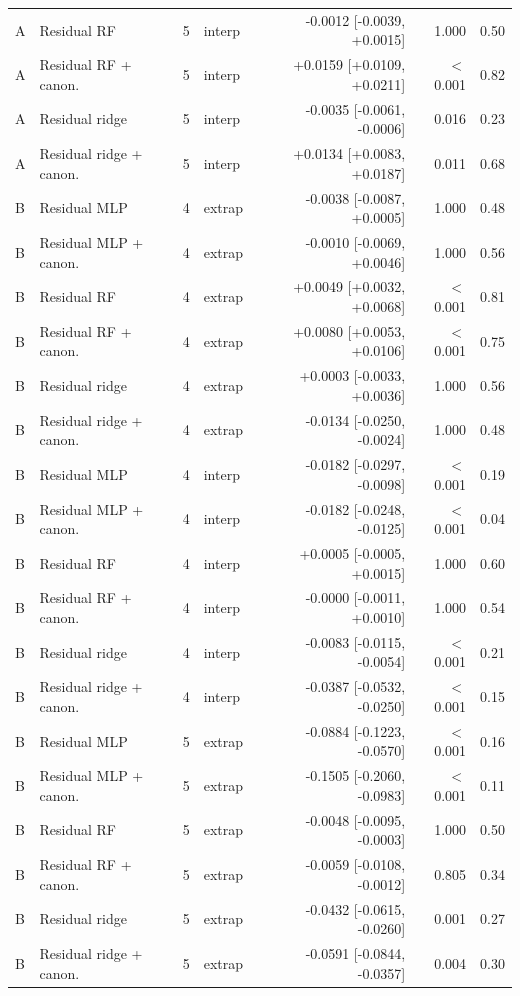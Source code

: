 \begin{longtable}{llrlrrr}
A & Residual RF & 5 & interp & -0.0012 [-0.0039, +0.0015] & 1.000 & 0.50 \\
A & Residual RF + canon. & 5 & interp & +0.0159 [+0.0109, +0.0211] & $<$0.001 & 0.82 \\
A & Residual ridge & 5 & interp & -0.0035 [-0.0061, -0.0006] & 0.016 & 0.23 \\
A & Residual ridge + canon. & 5 & interp & +0.0134 [+0.0083, +0.0187] & 0.011 & 0.68 \\
B & Residual MLP & 4 & extrap & -0.0038 [-0.0087, +0.0005] & 1.000 & 0.48 \\
B & Residual MLP + canon. & 4 & extrap & -0.0010 [-0.0069, +0.0046] & 1.000 & 0.56 \\
B & Residual RF & 4 & extrap & +0.0049 [+0.0032, +0.0068] & $<$0.001 & 0.81 \\
B & Residual RF + canon. & 4 & extrap & +0.0080 [+0.0053, +0.0106] & $<$0.001 & 0.75 \\
B & Residual ridge & 4 & extrap & +0.0003 [-0.0033, +0.0036] & 1.000 & 0.56 \\
B & Residual ridge + canon. & 4 & extrap & -0.0134 [-0.0250, -0.0024] & 1.000 & 0.48 \\
B & Residual MLP & 4 & interp & -0.0182 [-0.0297, -0.0098] & $<$0.001 & 0.19 \\
B & Residual MLP + canon. & 4 & interp & -0.0182 [-0.0248, -0.0125] & $<$0.001 & 0.04 \\
B & Residual RF & 4 & interp & +0.0005 [-0.0005, +0.0015] & 1.000 & 0.60 \\
B & Residual RF + canon. & 4 & interp & -0.0000 [-0.0011, +0.0010] & 1.000 & 0.54 \\
B & Residual ridge & 4 & interp & -0.0083 [-0.0115, -0.0054] & $<$0.001 & 0.21 \\
B & Residual ridge + canon. & 4 & interp & -0.0387 [-0.0532, -0.0250] & $<$0.001 & 0.15 \\
B & Residual MLP & 5 & extrap & -0.0884 [-0.1223, -0.0570] & $<$0.001 & 0.16 \\
B & Residual MLP + canon. & 5 & extrap & -0.1505 [-0.2060, -0.0983] & $<$0.001 & 0.11 \\
B & Residual RF & 5 & extrap & -0.0048 [-0.0095, -0.0003] & 1.000 & 0.50 \\
B & Residual RF + canon. & 5 & extrap & -0.0059 [-0.0108, -0.0012] & 0.805 & 0.34 \\
B & Residual ridge & 5 & extrap & -0.0432 [-0.0615, -0.0260] & 0.001 & 0.27 \\
B & Residual ridge + canon. & 5 & extrap & -0.0591 [-0.0844, -0.0357] & 0.004 & 0.30 \\

\end{longtable}
